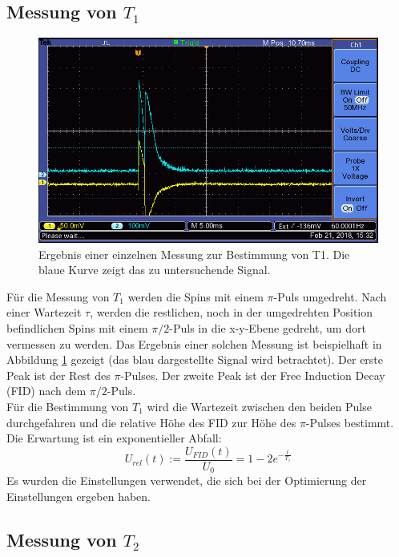 \documentclass[12pt,a4paper]{article}
\begin{document}
\subsection{Messung von $T_1$}

\begin{figure}
\centering
\includegraphics[scale=0.8]{Bilder/F0003TEK.PNG}
\caption{Ergebnis einer einzelnen Messung zur Bestimmung von T1. Die blaue Kurve zeigt das zu untersuchende Signal.}
\label{fig:MessungT1_Beispiel}
\end{figure}

Für die Messung von $T_1$ werden die Spins mit einem $\pi$-Puls umgedreht. Nach einer Wartezeit $\tau$, werden die restlichen, noch in der umgedrehten Position befindlichen Spins mit einem $\pi /2$-Puls in die x-y-Ebene gedreht, um dort vermessen zu werden. Das Ergebnis einer solchen Messung ist beispielhaft in Abbildung \ref{fig:MessungT1_Beispiel} gezeigt (das blau dargestellte Signal wird betrachtet). Der erste Peak ist der Rest des $\pi$-Pulses. Der zweite Peak ist der Free Induction Decay (FID) nach dem $\pi /2$-Puls. \\
Für die Bestimmung von $T_1$ wird die Wartezeit zwischen den beiden Pulse durchgefahren und die relative Höhe des FID zur Höhe des $\pi$-Pulses bestimmt. Die Erwartung ist ein exponentieller Abfall:
\begin{equation}
\label{eq:T1_Exponentialfunktion}
U_{rel} (t) := \dfrac{U_{FID} (t)}{U_0} = 1 - 2 e^{-\frac{t}{T_1}}
\end{equation}
Es wurden die Einstellungen verwendet, die sich bei der Optimierung der Einstellungen ergeben haben.

\subsection{Messung von $T_2$}
\end{document}
